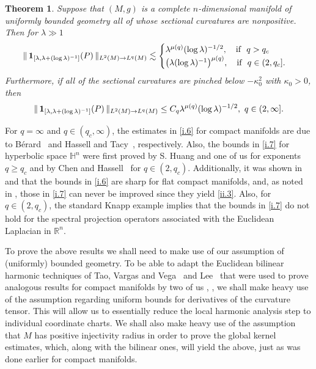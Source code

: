 \documentclass[10pt]{amsart}
\newtheorem{theorem}{Theorem}
\newcommand{\Rn}{{\mathbb R}^n}
\newcommand{\la}{\lambda}
\newcommand{\one}{{\bf 1}}
\newcommand{\1}{{\bf 1}}
\begin{document}
\begin{theorem}\label{bgsp}  Suppose that $(M,g)$ is a complete $n$-dimensional manifold of uniformly bounded geometry all of whose
sectional curvatures are nonpositive. Then for $\la \gg 1$
\begin{equation}\label{i.6}
\| \, \one_{[\la,\la+(\log\la)^{-1}]}(P) \, \|_{L^2(M)\to L^q(M)}\lesssim
\begin{cases} \la^{\mu(q)}(\log\la)^{-1/2}, \quad \text{if } \, \, q>q_c
\\
\bigl(\la(\log\la)^{-1}\bigr)^{\mu(q)}, \quad \text{if } \, \, q\in (2,q_c].
\end{cases}
\end{equation}
Furthermore, if all of the sectional curvatures are pinched below $-\kappa_0^2$ with $\kappa_0>0$, then
\begin{equation}\label{i.7}
\| \, \one_{[\la,\la+(\log\la)^{-1}]}(P) \, \|_{L^2(M)\to L^q(M)}\le C_q \la^{\mu(q)}(\log\la)^{-1/2}, \, \, q\in (2,\infty].
\end{equation}
\end{theorem}


For $q=\infty$ and $q\in (q_c,\infty)$, the estimates in \eqref{i.6} for compact manifolds are due to
B\'erard~\cite{Berard} and Hassell and Tacy~\cite{HassellTacy}, respectively.  Also, the bounds in
\eqref{i.7} for hyperbolic space ${\mathbb H}^n$ were first proved by S. Huang and one of us \cite{SHSo} for
exponents $q\ge q_c$ and by Chen and Hassell~\cite{ChHa} for $q\in (2,q_c)$.  Additionally, it was shown in
\cite{HSp} and \cite{HSqm} that the bounds in \eqref{i.6} are sharp for flat compact manifolds,
and, as noted in \cite{HSp}, those in \eqref{i.7} can never be improved since they yield \eqref{ii.3}.  Also,
for $q\in (2,q_c)$, the standard Knapp example implies that the bounds in \eqref{i.7} do not hold for the spectral
projection operators associated with the Euclidean Laplacian in $\Rn$.


To prove the above results we shall need to make use of our assumption of (uniformly) bounded geometry.
To be able to adapt the Euclidean bilinear harmonic techniques of Tao, Vargas and Vega~\cite{TaoVargasVega} and 
Lee~\cite{LeeBilinear} that were used to prove analogous results for compact manifolds by two of us \cite{HSp},
\cite{HSst}, we shall make heavy use of the assumption regarding uniform bounds for derivatives of the
curvature tensor.  This will allow us to essentially reduce the local harmonic analysis step to individual coordinate
charts.  We shall also make heavy use of the assumption that $M$ has positive injectivity radius
in order to prove the global kernel estimates, which, along with the bilinear ones, will yield the above, just as
was done earlier for compact manifolds.
\end{document}
